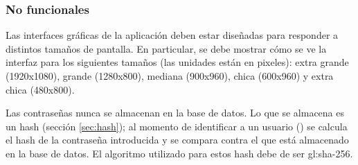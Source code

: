 %
%

\subsubsection{No funcionales}

{
  Las interfaces gráficas de la aplicación deben estar diseñadas para
  responder a distintos tamaños de pantalla. En particular, se debe
  mostrar cómo se ve la interfaz para los siguientes tamaños (las unidades están
  en pixeles): extra grande (1920x1080), grande (1280x800), mediana (900x960),
  chica (600x960) y extra chica (480x800).
}

{
  Las contraseñas nunca se almacenan en la base de datos. Lo que se almacena es
  un hash (sección \ref{sec:hash}); al momento de identificar a un usuario
  () se calcula el hash de la
  contraseña introducida y se compara contra el que está almacenado en la base
  de datos. El algoritmo utilizado para estos hash debe de ser \gls{gl:sha}-256.
}
